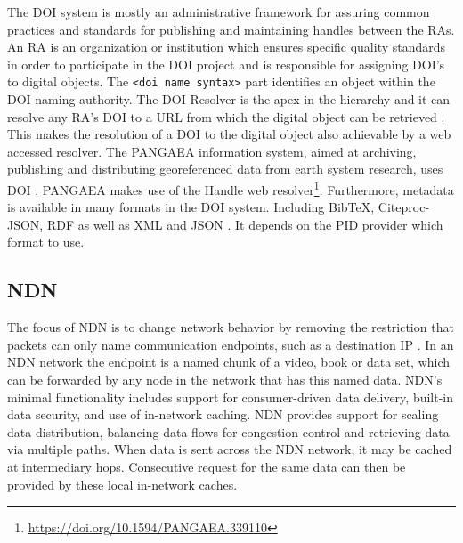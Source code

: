 The DOI system is mostly an administrative framework for assuring common practices and standards for publishing and maintaining handles between the RAs. An RA is an organization or institution which ensures specific quality standards in order to participate in the DOI project and is responsible for assigning DOI's to digital objects. The \texttt{<doi name syntax>} part identifies an object within the DOI naming authority. The DOI Resolver is the apex in the hierarchy and it can resolve any RA's DOI to a URL from which the digital object can be retrieved \cite{icn-bd}. This makes the resolution of a DOI to the digital object also achievable by a web accessed resolver. The PANGAEA information system, aimed at archiving, publishing and distributing georeferenced data from earth system research, uses DOI \cite{pang}. PANGAEA makes use of the Handle web resolver\footnote{\url{https://doi.org/10.1594/PANGAEA.339110}}.
Furthermore, metadata is available in many formats in the DOI system. Including BibTeX, Citeproc-JSON, RDF as well as XML and JSON \cite{doi-met}. It depends on the PID provider which format to use.

\subsection{NDN}
\label{overview-ndn}
The focus of NDN is to change network behavior by removing the restriction that packets can only name communication endpoints, such as a destination IP \cite{ndn-summary}. In an NDN network the endpoint is a named chunk of a video, book or data set, which can be forwarded by any node in the network that has this named data. NDN’s minimal functionality includes support for consumer-driven data delivery, built-in data security, and use of in-network caching. NDN provides support for scaling data distribution, balancing data flows for congestion control and retrieving data via multiple paths. When data is sent across the NDN network, it may be cached at intermediary hops. Consecutive request for the same data can then be provided by these local in-network caches.

